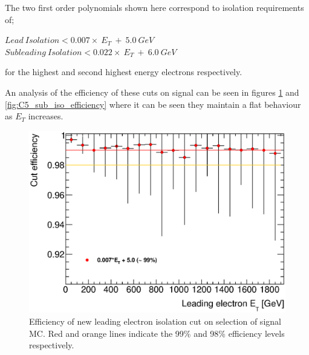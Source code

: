 The two first order polynomials shown here correspond to isolation requirements of;
   \begin{center}
   $Lead~Isolation < 0.007\times~E_{T}~+~5.0~GeV$\\
   $Subleading~Isolation < 0.022\times~E_{T}~+~6.0~GeV$\\
   \end{center}
for the highest and second highest energy electrons respectively. 

An analysis of the efficiency of these cuts on signal can be seen in figures \ref{fig:C5_lead_iso_efficiency} and \ref{fig:C5_sub_iso_efficiency} where it can be seen they maintain a flat behaviour as $E_{T}$ increases.


   \begin{figure}[h!]
      \begin{center}
      \includegraphics[scale=0.6]{images/C5_lead_iso_efficiency.eps}
      \end{center}
   \caption{Efficiency of new leading electron isolation cut on selection of signal MC. Red and orange lines indicate the 99\% and 98\% efficiency levels respectively.}
   \label{fig:C5_lead_iso_efficiency}
   \end{figure}

